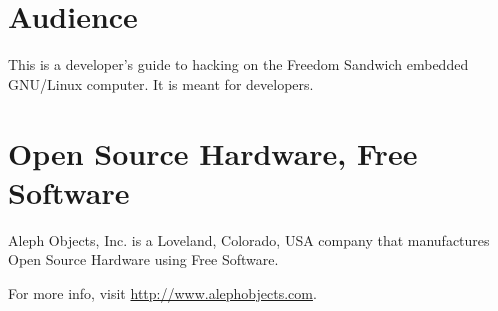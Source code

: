%
%
%
%
%

\section{Audience}
This is a developer's guide to hacking on the Freedom Sandwich embedded
GNU/Linux computer.
It is meant for developers.

\section{Open Source Hardware, Free Software}

Aleph Objects, Inc. is a Loveland, Colorado, USA company that manufactures
Open Source Hardware using Free Software.

For more info, visit \url{http://www.alephobjects.com}.

